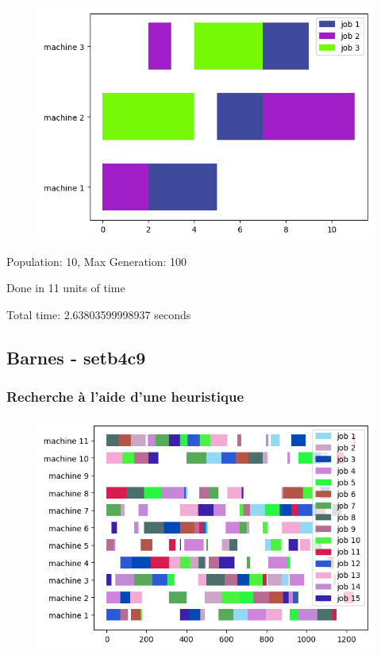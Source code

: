 \begin{figure}[!h]
    \centering
    \includegraphics[]{results/test_genetic.png}
\end{figure}

Population: 10, Max Generation: 100

Done in 11 units of time

Total time: 2.63803599998937 seconds
\frameboxend

\newpage

\subsection{Barnes - setb4c9}

\subsubsection{Recherche à l'aide d'une heuristique}

\begin{figure}[!h]
    \centering
    \includegraphics[]{results/barnes_setb4c9_shortest_operation.png}
\end{figure}

